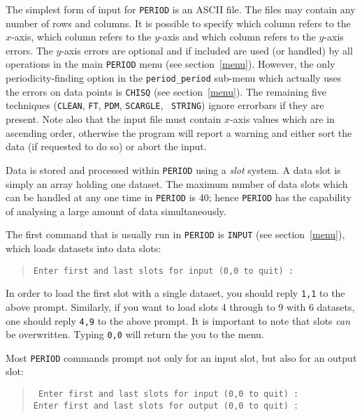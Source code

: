 The simplest form of input for {\tt PERIOD} is an ASCII file.  The
files may contain any number of rows and columns. It is possible to
specify which column refers to the $x$-axis, which column refers to
the $y$-axis and which column refers to the $y$-axis errors.
The $y$-axis errors are optional and if included are used (or handled)
by all operations in the main {\tt PERIOD} menu (see
section~\ref{menu}).  However, the only periodicity-finding option in
the {\tt period\_period} sub-menu which actually uses the errors on
data points is {\tt CHISQ} (see section~\ref{menu}). The remaining five
techniques ({\tt CLEAN}, {\tt FT}, {\tt PDM}, {\tt SCARGLE}, {\tt
STRING}) ignore errorbars if they are present. Note also that the input
file must contain $x$-axis values which are in ascending order,
otherwise the program will report a warning and either sort the data
(if requested to do so) or abort the input.

Data is stored and processed within {\tt PERIOD} using a {\em slot} system.
A data slot is simply an array holding one dataset. The maximum number
of data slots which can be handled at any one time in {\tt PERIOD} is 40;
hence {\tt PERIOD} has the capability of analysing a large amount of data
simultaneously.

The first command that is usually run in {\tt PERIOD} is {\tt INPUT}
(see section~\ref{menu}), which loads datasets into data slots:

\begin{quote}
{\tt Enter first and last slots for input (0,0 to quit) :}
\end{quote}

In order to load the first slot with a single dataset, you should reply
{\tt 1,1} to the above prompt. Similarly, if you want to load slots
4 through to 9 with 6 datasets, one should reply {\tt 4,9} to the above
prompt. It is important to note that slots {\em can} be overwritten.
Typing {\tt 0,0} will return the you to the menu.

Most {\tt PERIOD} commands prompt not only for an input slot, but also for
an output slot:

\begin{quote}{\tt
Enter first and last slots for input  (0,0 to quit) : \\
Enter first and last slots for output (0,0 to quit) : }
\end{quote}

